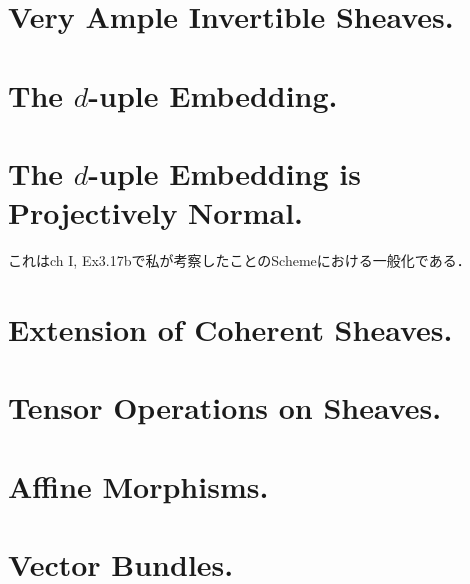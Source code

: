 \documentclass[a4paper]{jsarticle}
\begin{document}
\section{Very Ample Invertible Sheaves.} %

\section{The $d$-uple Embedding.} %

\section{The $d$-uple Embedding is Projectively Normal.} %
これはch I, Ex3.17bで私が考察したことのSchemeにおける一般化である．

\section{Extension of Coherent Sheaves.} %

\section{Tensor Operations on Sheaves.} %

\section{Affine Morphisms.} %

\section{Vector Bundles.} %
\end{document}
